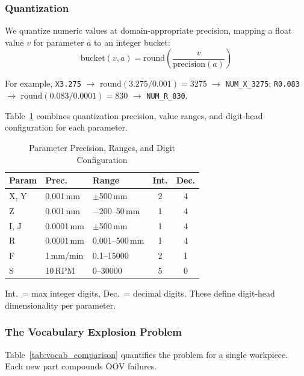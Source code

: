 \documentclass[11pt]{article}
\begin{document}
\subsubsection{Quantization}

We quantize numeric values at domain-appropriate precision, mapping a float value $v$ for parameter $a$ to an integer bucket:
\begin{equation}
    \text{bucket}(v, a) = \text{round}\!\left(\frac{v}{\text{precision}(a)}\right)
\end{equation}

\noindent For example, \texttt{X3.275} $\to$ $\text{round}(3.275/0.001) = 3275$ $\to$ \texttt{NUM\_X\_3275}; \texttt{R0.083} $\to$ $\text{round}(0.083/0.0001) = 830$ $\to$ \texttt{NUM\_R\_830}.

Table~\ref{tab:precision} combines quantization precision, value ranges, and digit-head configuration for each parameter.

\begin{table}[htbp]
\centering
\caption{Parameter Precision, Ranges, and Digit Configuration}
\label{tab:precision}
\small
\begin{tabular}{@{}lllcc@{}}
\toprule
\textbf{Param} & \textbf{Prec.} & \textbf{Range} & \textbf{Int.} & \textbf{Dec.} \\
\midrule
X, Y  & 0.001\,mm  & $\pm$500\,mm     & 2 & 4 \\
Z     & 0.001\,mm  & $-$200--50\,mm   & 1 & 4 \\
I, J  & 0.0001\,mm & $\pm$500\,mm     & 1 & 4 \\
R     & 0.0001\,mm & 0.001--500\,mm   & 1 & 4 \\
F     & 1\,mm/min  & 0.1--15000       & 2 & 1 \\
S     & 10\,RPM    & 0--30000         & 5 & 0 \\
\bottomrule
\end{tabular}
\normalsize

\smallskip
{\small Int.\ = max integer digits, Dec.\ = decimal digits. These define digit-head dimensionality per parameter.}
\end{table}

\subsubsection{The Vocabulary Explosion Problem}

Table~\ref{tab:vocab_comparison} quantifies the problem for a single workpiece. Each new part compounds OOV failures.
\end{document}
